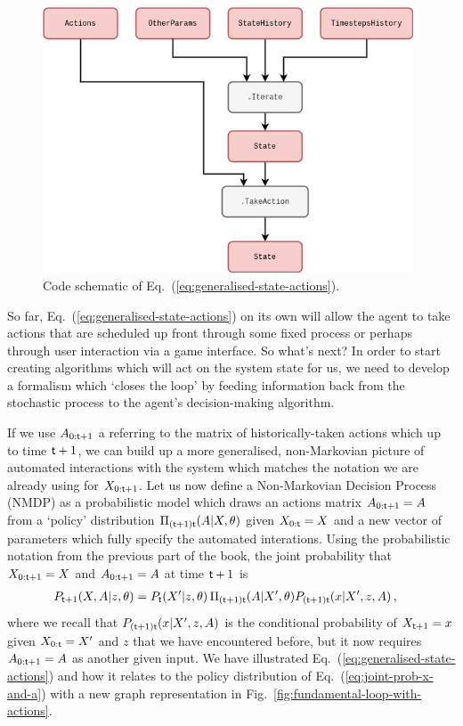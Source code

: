 \begin{figure}[h]
\centering
\includegraphics[width=11cm]{images/chapter-5-iterations-with-actions.drawio.png}
\caption{Code schematic of Eq.~(\ref{eq:generalised-state-actions}).}
\label{fig:iterations-with-actions}
\end{figure}

So far, Eq.~(\ref{eq:generalised-state-actions}) on its own will allow the agent to take actions that are scheduled up front through some fixed process or perhaps through user interaction via a game interface. So what's next? In order to start creating algorithms which will act on the system state for us, we need to develop a formalism which `closes the loop' by feeding information back from the stochastic process to the agent's decision-making algorithm.

If we use $A_{0:{\sf t}+1}$ a referring to the matrix of historically-taken actions which up to time ${\sf t}+1$, we can build up a more generalised, non-Markovian picture of automated interactions with the system which matches the notation we are already using for $X_{0:{\sf t}+1}$. Let us now define a Non-Markovian Decision Process (NMDP) as a probabilistic model which draws an actions matrix $A_{0:{\sf t}+1}=A$ from a `policy' distribution $\Pi_{({\sf t}+1){\sf t}}(A\vert X,\theta)$ given $X_{0:{\sf t}}=X$ and a new vector of parameters which fully specify the automated interations. Using the probabilistic notation from the previous part of the book, the joint probability that $X_{0:{\sf t}+1}=X$ and $A_{0:{\sf t}+1}=A$ at time ${\sf t}+1$ is
\begin{align}
P_{{\sf t}+1}(X,A\vert z, \theta ) &= P_{{\sf t}}(X'\vert z,\theta ) \, \Pi_{({\sf t}+1){\sf t}}(A\vert X',\theta)P_{({\sf t}+1){\sf t}}(x\vert X',z,A) \label{eq:joint-prob-x-and-a} \,,
\end{align}
where we recall that $P_{({\sf t}+1){\sf t}}(x\vert X',z,A)$ is the conditional probability of $X_{{\sf t}+1}=x$ given $X_{0:{\sf t}}=
X'$ and $z$ that we have encountered before, but it now requires $A_{0:{\sf t}+1}=A$ as another given input. We have illustrated Eq.~(\ref{eq:generalised-state-actions}) and how it relates to the policy distribution of Eq.~(\ref{eq:joint-prob-x-and-a}) with a new graph representation in Fig.~\ref{fig:fundamental-loop-with-actions}.

